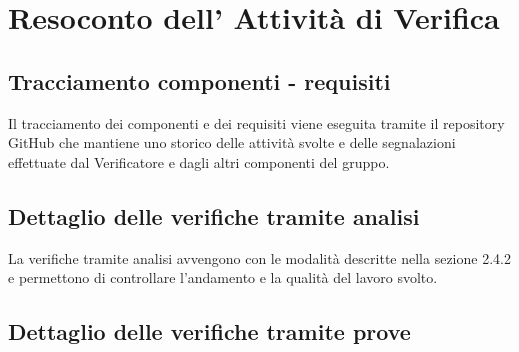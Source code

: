 \section{Resoconto dell' Attività di Verifica}

\subsection{Tracciamento componenti - requisiti}
Il tracciamento dei componenti e dei requisiti viene eseguita tramite il repository GitHub che mantiene uno storico delle attività svolte e delle segnalazioni effettuate dal Verificatore e dagli altri componenti del gruppo.
\subsection{Dettaglio delle verifiche tramite analisi}
La verifiche tramite analisi avvengono con le modalità descritte nella sezione 2.4.2 e permettono di controllare l'andamento e la qualità del lavoro svolto.
\subsection{Dettaglio delle verifiche tramite prove}
